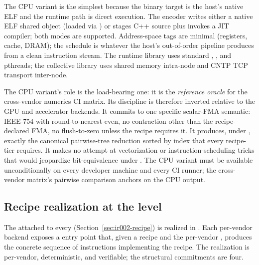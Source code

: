 The CPU variant is the simplest because the binary target is the host's native ELF and the runtime path is direct execution.
The encoder writes either a native ELF shared object (loaded via ) or stages C++ source plus invokes a JIT compiler; both modes are supported.
Address-space tags are minimal (registers, cache, DRAM); the schedule is whatever the host's out-of-order pipeline produces from a clean instruction stream.
The runtime library uses standard , , and pthreads; the collective library uses shared memory intra-node and CNTP TCP transport inter-node.

The CPU variant's role is the load-bearing one: it is the \emph{reference oracle} for the cross-vendor numerics CI matrix.
Its discipline is therefore inverted relative to the GPU and accelerator backends.
It commits to one specific scalar-FMA semantic: IEEE-754 with round-to-nearest-even, no contraction other than the recipe-declared FMA, no flush-to-zero unless the recipe requires it.
It produces, under , exactly the canonical pairwise-tree reduction sorted by index that every recipe-tier requires.
It makes no attempt at vectorization or instruction-scheduling tricks that would jeopardize bit-equivalence under .
The CPU variant must be available unconditionally on every developer machine and every CI runner; the cross-vendor matrix's pairwise comparison anchors on the CPU output.

\subsection{Recipe realization at the  level}
\label{sec:ir003-recipe-realization}

The  attached to every  (Section~\ref{sec:ir002-recipe}) is realized in .
Each per-vendor backend exposes a  entry point that, given a recipe and the per-vendor , produces the concrete sequence of  instructions implementing the recipe.
The realization is per-vendor, deterministic, and verifiable; the structural commitments are four.

